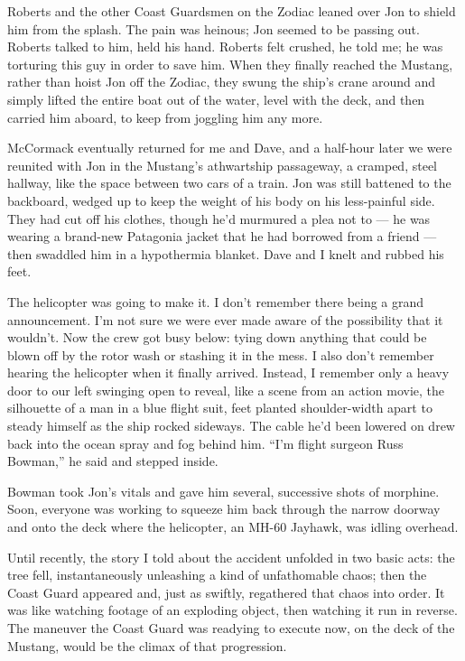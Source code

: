 Roberts and the other Coast Guardsmen on the Zodiac leaned over Jon to
shield him from the splash. The pain was heinous; Jon seemed to be
passing out. Roberts talked to him, held his hand. Roberts felt crushed,
he told me; he was torturing this guy in order to save him. When they
finally reached the Mustang, rather than hoist Jon off the Zodiac, they
swung the ship's crane around and simply lifted the entire boat out of
the water, level with the deck, and then carried him aboard, to keep
from joggling him any more.

McCormack eventually returned for me and Dave, and a half-hour later we
were reunited with Jon in the Mustang's athwartship passageway, a
cramped, steel hallway, like the space between two cars of a train. Jon
was still battened to the backboard, wedged up to keep the weight of his
body on his less-painful side. They had cut off his clothes, though he'd
murmured a plea not to --- he was wearing a brand-new Patagonia jacket
that he had borrowed from a friend --- then swaddled him in a
hypothermia blanket. Dave and I knelt and rubbed his feet.

The helicopter was going to make it. I don't remember there being a
grand announcement. I'm not sure we were ever made aware of the
possibility that it wouldn't. Now the crew got busy below: tying down
anything that could be blown off by the rotor wash or stashing it in the
mess. I also don't remember hearing the helicopter when it finally
arrived. Instead, I remember only a heavy door to our left swinging open
to reveal, like a scene from an action movie, the silhouette of a man in
a blue flight suit, feet planted shoulder-width apart to steady himself
as the ship rocked sideways. The cable he'd been lowered on drew back
into the ocean spray and fog behind him. ``I'm flight surgeon Russ
Bowman,'' he said and stepped inside.

Bowman took Jon's vitals and gave him several, successive shots of
morphine. Soon, everyone was working to squeeze him back through the
narrow doorway and onto the deck where the helicopter, an MH-60 Jayhawk,
was idling overhead.

Until recently, the story I told about the accident unfolded in two
basic acts: the tree fell, instantaneously unleashing a kind of
unfathomable chaos; then the Coast Guard appeared and, just as swiftly,
regathered that chaos into order. It was like watching footage of an
exploding object, then watching it run in reverse. The maneuver the
Coast Guard was readying to execute now, on the deck of the Mustang,
would be the climax of that progression.

